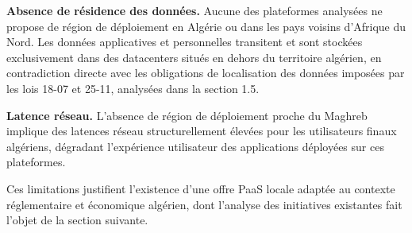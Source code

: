 \textbf{Absence de résidence des données.} Aucune des plateformes analysées ne propose de région de déploiement en Algérie ou dans les pays voisins d'Afrique du Nord. Les données applicatives et personnelles transitent et sont stockées exclusivement dans des datacenters situés en dehors du territoire algérien, en contradiction directe avec les obligations de localisation des données imposées par les lois 18-07 et 25-11, analysées dans la section 1.5.

\textbf{Latence réseau.} L'absence de région de déploiement proche du Maghreb implique des latences réseau structurellement élevées pour les utilisateurs finaux algériens, dégradant l'expérience utilisateur des applications déployées sur ces plateformes.

Ces limitations justifient l'existence d'une offre PaaS locale adaptée au contexte réglementaire et économique algérien, dont l'analyse des initiatives existantes fait l'objet de la section suivante.


